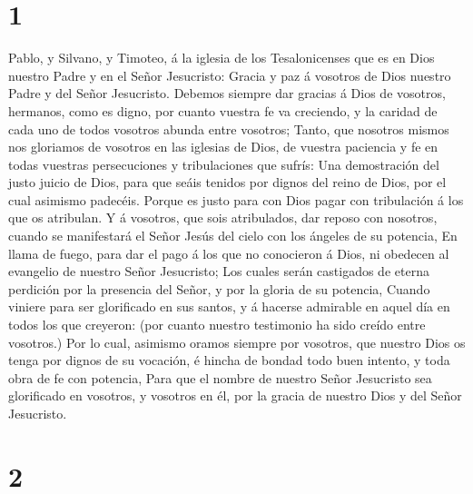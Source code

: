 \hypertarget{section}{%
\section{1}\label{section}}

 Pablo, y Silvano, y Timoteo, á la iglesia de los
Tesalonicenses que es en Dios nuestro Padre y en el Señor Jesucristo:
 Gracia y paz á vosotros de Dios nuestro Padre y del Señor
Jesucristo.  Debemos siempre dar gracias á Dios de vosotros,
hermanos, como es digno, por cuanto vuestra fe va creciendo, y la
caridad de cada uno de todos vosotros abunda entre vosotros;
 Tanto, que nosotros mismos nos gloriamos de vosotros en las
iglesias de Dios, de vuestra paciencia y fe en todas vuestras
persecuciones y tribulaciones que sufrís:  Una demostración
del justo juicio de Dios, para que seáis tenidos por dignos del reino de
Dios, por el cual asimismo padecéis.  Porque es justo para
con Dios pagar con tribulación á los que os atribulan.  Y á
vosotros, que sois atribulados, dar reposo con nosotros, cuando se
manifestará el Señor Jesús del cielo con los ángeles de su potencia,
 En llama de fuego, para dar el pago á los que no conocieron
á Dios, ni obedecen al evangelio de nuestro Señor Jesucristo;
 Los cuales serán castigados de eterna perdición por la
presencia del Señor, y por la gloria de su potencia, 
Cuando viniere para ser glorificado en sus santos, y á hacerse admirable
en aquel día en todos los que creyeron: (por cuanto nuestro testimonio
ha sido creído entre vosotros.)  Por lo cual, asimismo
oramos siempre por vosotros, que nuestro Dios os tenga por dignos de su
vocación, é hincha de bondad todo buen intento, y toda obra de fe con
potencia,  Para que el nombre de nuestro Señor Jesucristo
sea glorificado en vosotros, y vosotros en él, por la gracia de nuestro
Dios y del Señor Jesucristo.

\hypertarget{section-1}{%
\section{2}\label{section-1}}

